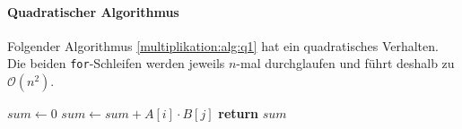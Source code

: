 \paragraph{Quadratischer Algorithmus}

Folgender Algorithmus \ref{multiplikation:alg:q1} hat ein quadratisches Verhalten.
Die beiden \texttt{for}-Schleifen werden jeweils $n$-mal durchglaufen und f\"uhrt deshalb zu $\mathcal{O}\left(n^2\right)$.


\begin{algorithm}[H]\caption{}
	\label{multiplikation:alg:q1}
	\setlength{\lineskip}{7pt}
	\begin{algorithmic}
		\State $ sum \gets 0$
		\State $ sum \gets sum + A[i] \cdot B[j] $
		\EndFor
		\EndFor
		\State \textbf{return} $sum$
		\EndFunction
	\end{algorithmic}
\end{algorithm}



